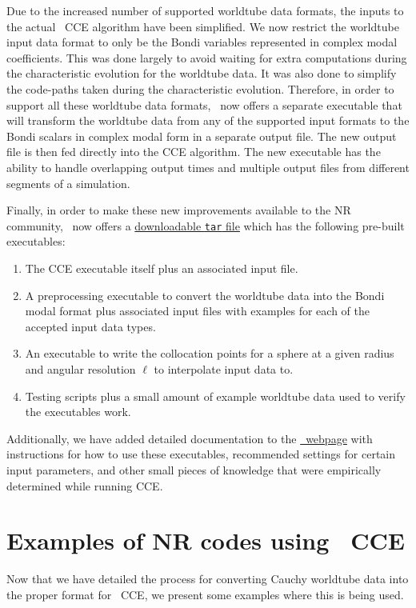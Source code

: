 \begin{bibunit}[unsrtnat]
Due to the increased number of supported worldtube data formats, the inputs to
the actual \spectre~CCE algorithm have been simplified. We now restrict the
worldtube input data format to only be the Bondi variables represented in
complex modal coefficients. This was done largely to avoid waiting for extra
computations during the characteristic evolution for the worldtube data. It was
also done to simplify the code-paths taken during the characteristic evolution.
Therefore, in order to support all these worldtube data formats, \spectre~now
offers a separate executable that will transform the worldtube data from any of
the supported input formats to the Bondi scalars in complex modal form in a
separate output file. The new output file is then fed directly into the CCE
algorithm. The new executable has the ability to handle overlapping output times
and multiple output files from different segments of a simulation.

Finally, in order to make these new improvements available to the NR community,
\spectre~now offers a
\href{https://github.com/sxs-collaboration/spectre/releases}{downloadable
\texttt{tar} file} which has the following pre-built executables:
\begin{enumerate}
  \item The CCE executable itself plus an associated input file.
  \item A preprocessing executable to convert the worldtube data into the Bondi
        modal format plus associated input files with examples for each of
        the accepted input data types.
  \item An executable to write the collocation points for a sphere at a given
        radius and angular resolution $\ell$ to interpolate input data to.
  \item Testing scripts plus a small amount of example worldtube data used to
        verify the executables work.
\end{enumerate}
Additionally, we have added detailed documentation to the
\href{https://spectre-code.org/index.html}{\spectre~webpage} with instructions
for how to use these executables, recommended settings for certain input
parameters, and other small pieces of knowledge that were empirically determined
while running CCE.

\section{Examples of NR codes using \spectre~CCE\label{sec:cce_codes_examples}}
Now that we have detailed the process for converting Cauchy worldtube data into the
proper format for \spectre~CCE, we present some examples where this is
being used.


\end{bibunit}
